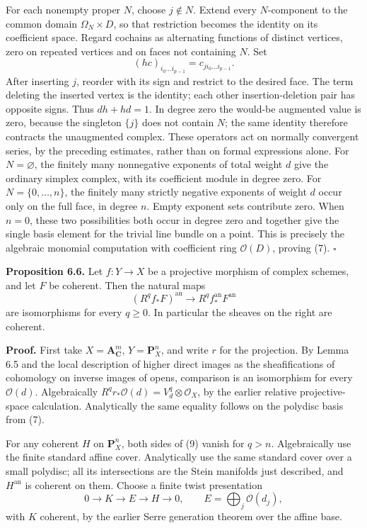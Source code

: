 \documentclass[11pt]{article}
\begin{document}
For each nonempty proper \(N\), choose \(j\notin N\). Extend every
\(N\)-component to the common domain \(\Omega_N\times D\), so that
restriction becomes the identity on its coefficient space. Regard
cochains as alternating functions of distinct vertices, zero on repeated
vertices and on faces not containing \(N\). Set \[
(hc)_{i_0\ldots i_{p-1}}=c_{j i_0\ldots i_{p-1}}.
\] After inserting \(j\), reorder with its sign and restrict to the
desired face. The term deleting the inserted vertex is the identity;
each other insertion-deletion pair has opposite signs. Thus \(dh+hd=1\).
In degree zero the would-be augmented value is zero, because the
singleton \(\{j\}\) does not contain \(N\); the same identity therefore
contracts the unaugmented complex. These operators act on normally
convergent series, by the preceding estimates, rather than on formal
expressions alone. For \(N=\varnothing\), the finitely many nonnegative
exponents of total weight \(d\) give the ordinary simplex complex, with
its coefficient module in degree zero. For \(N=\{0,\ldots,n\}\), the
finitely many strictly negative exponents of weight \(d\) occur only on
the full face, in degree \(n\). Empty exponent sets contribute zero.
When \(n=0\), these two possibilities both occur in degree zero and
together give the single basis element for the trivial line bundle on a
point. This is precisely the algebraic monomial computation with
coefficient ring \(\mathcal O(D)\), proving (7). \(\square\)

\textbf{Proposition 6.6.} Let \(f:Y\to X\) be a projective morphism of
complex schemes, and let \(F\) be coherent. Then the natural maps \[
(R^qf_*F)^{\mathrm{an}}
\longrightarrow R^qf^{\mathrm{an}}_*F^{\mathrm{an}}
\tag{9}
\] are isomorphisms for every \(q\ge0\). In particular the sheaves on
the right are coherent.

\textbf{Proof.} First take \(X=\mathbf A^m_{\mathbf C}\),
\(Y=\mathbf P^n_X\), and write \(r\) for the projection. By Lemma 6.5
and the local description of higher direct images as the sheafifications
of cohomology on inverse images of opens, comparison is an isomorphism
for every \(\mathcal O(d)\). Algebraically
\(R^qr_*\mathcal O(d)=V_d^q\otimes\mathcal O_X\), by the earlier
relative projective-space calculation. Analytically the same equality
follows on the polydisc basis from (7).

For any coherent \(H\) on \(\mathbf P^n_X\), both sides of (9) vanish
for \(q>n\). Algebraically use the finite standard affine cover.
Analytically use the same standard cover over a small polydisc; all its
intersections are the Stein manifolds just described, and
\(H^{\mathrm{an}}\) is coherent on them. Choose a finite twist
presentation \[
0\to K\to E\to H\to0,
\qquad E=\bigoplus_j\mathcal O(d_j),
\tag{10}
\] with \(K\) coherent, by the earlier Serre generation theorem over the
affine base.
\end{document}

